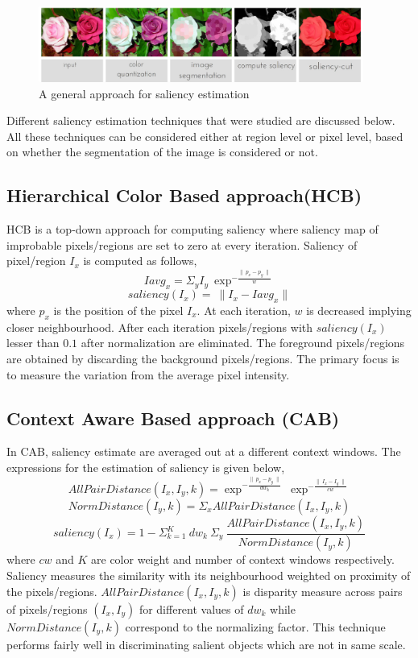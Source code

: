 \begin{figure}[htpb]
   \begin{center}
	    \includegraphics[width=0.95\textwidth]{snaps/sal/saliency.eps}     
     \caption {A general approach for saliency estimation}
   \label{fig:salap}
   \end{center}
 \end{figure}

\par Different saliency estimation techniques that were studied are discussed below.  All these techniques can be considered either at region level or pixel level, based on whether the segmentation of the image is considered or not.

\subsection{Hierarchical Color Based approach(HCB)} 
HCB is a top-down approach for computing saliency where saliency map of improbable pixels/regions are set to zero at every iteration.  Saliency of pixel/region $I_{x}$ is computed as follows,
$$ Iavg_{x} = \Sigma_{y} I_{y}~\exp^{-\frac{\parallel~p_{x} - p_{y}~\parallel}{w}}  $$
$$ saliency(I_{x}) =~\parallel I_{x} - Iavg_{x} \parallel $$
where $p_{x}$ is the position of the pixel $I_{x}$.  At each iteration, $w$ is decreased implying closer neighbourhood.  After each iteration pixels/regions with $ saliency(I_{x})$ lesser than $0.1$ after normalization are eliminated.  The foreground pixels/regions are obtained by discarding the background pixels/regions.  The primary focus is to measure the variation from the average pixel intensity.

\subsection{Context Aware Based approach (CAB)}
In CAB, saliency estimate are averaged out at a different context windows.  The expressions for the estimation of saliency is given below,
$$ AllPairDistance(I_{x},I_{y},k) = \exp^{-\frac{\parallel~p_x - p_y~\parallel}{dw_k}}~\exp^{-\frac{\parallel~I_{x} - I_{y}~\parallel}{cw}}$$
$$ NormDistance(I_{y},k) = \Sigma_{x} AllPairDistance(I_{x},I_{y},k)$$
$$ saliency(I_{x}) = 1- \Sigma^{K}_{k=1}~dw_{k}~\Sigma_{y}~\frac{AllPairDistance(I_{x},I_{y},k)}{NormDistance(I_{y},k)}$$
where $cw$ and $K$ are color weight and number of context windows respectively.  Saliency measures the similarity with its neighbourhood weighted on proximity of the pixels/regions. $AllPairDistance(I_{x},I_{y},k)$ is disparity measure across pairs of pixels/regions $(I_{x},I_{y})$ for different values of $dw_{k}$ while $NormDistance(I_{y},k)$ correspond to the normalizing factor. This technique performs fairly well in discriminating salient objects which are not in same scale.

